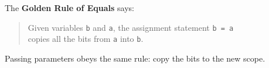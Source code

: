 The \textbf{Golden Rule of Equals} says:

\begin{quote}
Given variables \lstinline$b$ and \lstinline$a$, the assignment statement
\lstinline$b = a$ \\
copies all the bits from \lstinline$a$ into \lstinline$b$.
\end{quote}

Passing parameters obeys the same rule: copy the bits to the new scope.
